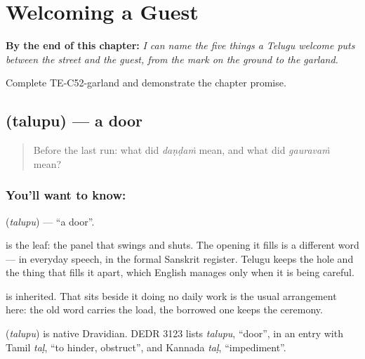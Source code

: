 
\chapter{Welcoming a Guest}
\label{ch:te-welcome}

\begin{chapteropening}
\textbf{By the end of this chapter:} \emph{I can name the five things a Telugu welcome puts between the street and the guest, from the mark on the ground to the garland.}

Complete TE-C52-garland and demonstrate the chapter promise.
\end{chapteropening}

\section[\texorpdfstring{\te{తలుపు} (talupu)}{తలుపు (talupu)}]{ (talupu) — a door}

\label{lesson:TE-C52-door}



\begin{quote}
Before the last run: what did \emph{daṇḍaṁ} mean, and what did \emph{gauravaṁ} mean?
\end{quote}

\subsection*{You'll want to know: }
\textbf{} (\emph{talupu}) — \textquotedblleft{}a door\textquotedblright{}.

 is the leaf: the panel that swings and shuts. The opening it fills is a different word —  in everyday speech,  in the formal Sanskrit register. Telugu keeps the hole and the thing that fills it apart, which English manages only when it is being careful.

 is inherited. That  sits beside it doing no daily work is the usual arrangement here: the old word carries the load, the borrowed one keeps the ceremony.

\begin{cousinweb}
\textbf{} (\emph{talupu}) is native Dravidian. DEDR 3123 lists \emph{talupu}, \textquotedblleft{}door\textquotedblright{}, in an entry with Tamil \emph{taḷ}, \textquotedblleft{}to hinder, obstruct\textquotedblright{}, and Kannada \emph{taḷ}, \textquotedblleft{}impediment\textquotedblright{}.
\end{cousinweb}

